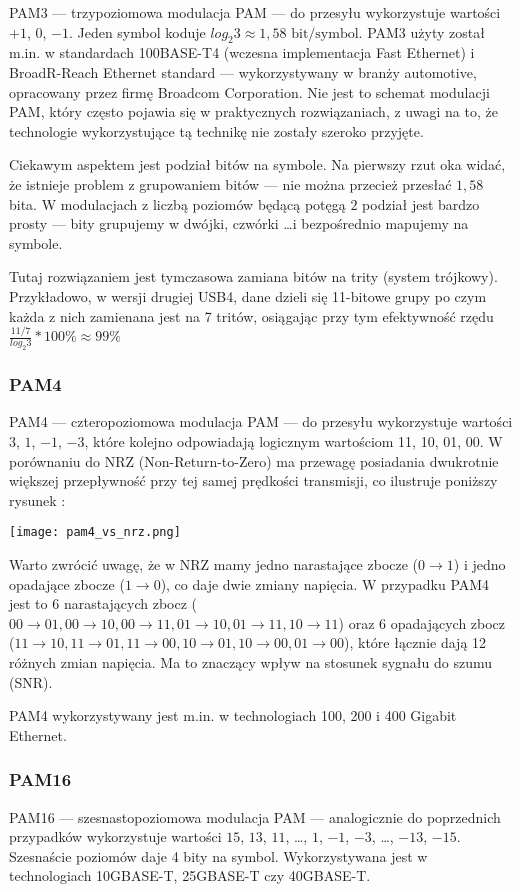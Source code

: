 PAM3 --- trzypoziomowa modulacja PAM --- do przesyłu wykorzystuje wartości $+1$, $0$, $-1$. Jeden symbol koduje $log_{2}{3} \approx 1,58 \text{ bit/symbol}$.
PAM3 użyty został m.in. w standardach 100BASE-T4 (wczesna implementacja Fast Ethernet) i BroadR-Reach Ethernet standard --- wykorzystywany w branży automotive, opracowany przez firmę Broadcom Corporation.
Nie jest to schemat modulacji PAM, który często pojawia się w praktycznych rozwiązaniach, z uwagi na to, że technologie wykorzystujące tą technikę nie zostały szeroko przyjęte.

Ciekawym aspektem jest podział bitów na symbole. Na pierwszy rzut oka widać, że istnieje problem z grupowaniem bitów --- nie można przecież przesłać $1,58$ bita. W modulacjach z liczbą poziomów będącą potęgą $2$ podział jest bardzo prosty --- bity grupujemy w dwójki, czwórki \dots i bezpośrednio mapujemy na symbole.

Tutaj rozwiązaniem jest tymczasowa zamiana bitów na trity (system trójkowy). Przykładowo, w wersji drugiej USB4, dane dzieli się 11-bitowe grupy po czym każda z nich zamienana jest na 7 tritów, osiągając przy tym
efektywność rzędu $\frac{11/7}{log_{2}{3}} * 100\% \approx 99\% $


\subsubsection{PAM4}

PAM4 --- czteropoziomowa modulacja PAM --- do przesyłu wykorzystuje wartości $3$, $1$, $-1$, $-3$, które kolejno odpowiadają logicznym wartościom 11, 10, 01, 00. W porównaniu do NRZ (Non-Return-to-Zero) ma przewagę posiadania dwukrotnie większej przepływność przy tej samej prędkości transmisji, co ilustruje poniższy rysunek \cite{Intel-pam4}:

\texttt{[image: pam4\_vs\_nrz.png]}

Warto zwrócić uwagę, że w NRZ mamy jedno narastające zbocze ($0 \rightarrow 1$) i jedno opadające zbocze ($1 \rightarrow 0$), co daje dwie zmiany napięcia. W przypadku PAM4 jest to 6 narastających zbocz
($00 \rightarrow 01, 00 \rightarrow 10, 00 \rightarrow 11, 01 \rightarrow 10, 01 \rightarrow 11, 10 \rightarrow 11$) oraz 6 opadających zbocz
($11 \rightarrow 10, 11 \rightarrow 01, 11 \rightarrow 00, 10 \rightarrow 01, 10 \rightarrow 00, 01 \rightarrow 00$), które łącznie dają 12 różnych zmian napięcia.
Ma to znaczący wpływ na stosunek sygnału do szumu (SNR).

PAM4 wykorzystywany jest m.in. w technologiach 100, 200 i 400 Gigabit Ethernet.

\subsubsection{PAM16}

PAM16 --- szesnastopoziomowa modulacja PAM --- analogicznie do poprzednich przypadków wykorzystuje wartości $15$, $13$, $11$, \dots , $1$, $-1$, $-3$, \dots , $-13$, $-15$. Szesnaście poziomów daje 4 bity na symbol. Wykorzystywana jest w technologiach 10GBASE-T, 25GBASE-T czy 40GBASE-T.